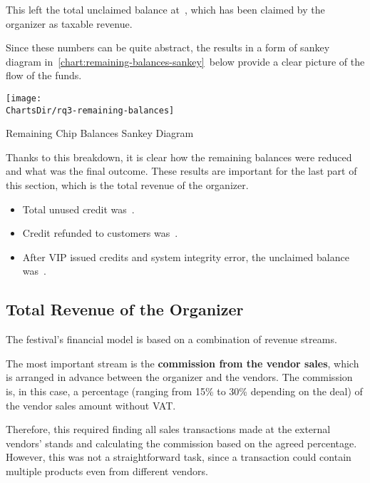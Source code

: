 This left the total unclaimed balance at~, which has been claimed by the organizer as taxable revenue.

Since these numbers can be quite abstract, the results in a form of sankey diagram in~\autoref{chart:remaining-balances-sankey}~below provide a clear picture of the flow of the funds.

\begin{chart}[H]
	\centering
	\texttt{[image: \\ChartsDir/rq3-remaining-balances]}
	\caption{ Remaining Chip Balances Sankey Diagram}
	\label{chart:remaining-balances-sankey}
	\source
\end{chart}

Thanks to this breakdown, it is clear how the remaining balances were reduced and what was the final outcome.
These results are important for the last part of this section, which is the total revenue of the organizer.

\begin{keytakeaways}
	\begin{itemize}
		\item Total unused credit was~.
		\item Credit refunded to customers was~.
		\item After VIP issued credits and system integrity error, the unclaimed balance was~.
	\end{itemize}
\end{keytakeaways}


\subsection{Total Revenue of the Organizer}
\label{subsec:analysis-total-revenue}

The festival's financial model is based on a combination of revenue streams.

The most important stream is the \textbf{commission from the vendor sales}, which is arranged in advance between the organizer and the vendors.
The commission is, in this case, a percentage (ranging from 15\% to 30\% depending on the deal) of the vendor sales amount without VAT\@.

Therefore, this required finding all sales transactions made at the external vendors' stands and calculating the commission based on the agreed percentage.
However, this was not a straightforward task, since a transaction could contain multiple products even from different vendors.

